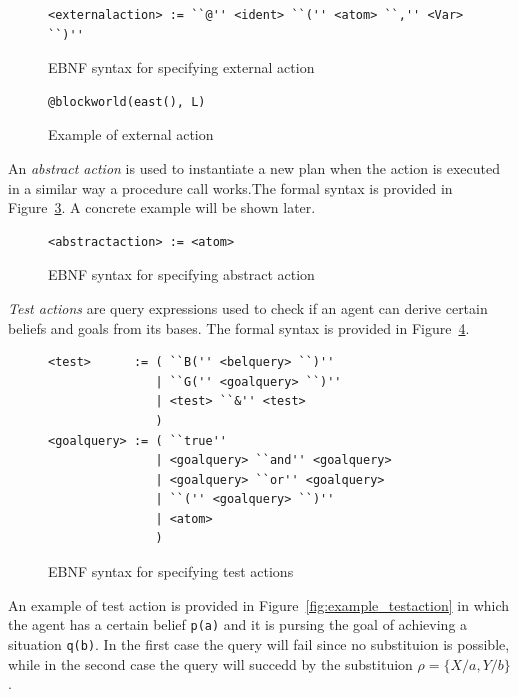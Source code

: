 \documentclass[a4paper]{article}
\begin{document}
\begin{figure}[htp]
\begin{verbatim}
<externalaction> := ``@'' <ident> ``('' <atom> ``,'' <Var> ``)''
\end{verbatim}
\caption{EBNF syntax for specifying external action}
\label{fig:ebnf_extaction}
\end{figure}

\begin{figure}[htp]
\begin{verbatim}
@blockworld(east(), L)
\end{verbatim}
\caption{Example of external action}
\label{fig:example_extaction}
\end{figure}

An \emph{abstract action} is used to instantiate a new plan when the action is executed in a similar way a procedure call works.The formal syntax is provided in Figure~\ref{fig:ebnf_absaction}. A concrete example will be shown later.

\begin{figure}[htp]
\begin{verbatim}
<abstractaction> := <atom>
\end{verbatim}
\caption{EBNF syntax for specifying abstract action}
\label{fig:ebnf_absaction}
\end{figure}

\emph{Test actions} are query expressions used to check if an agent can derive certain beliefs and goals from its bases. The formal syntax is provided in Figure~\ref{fig:ebnf_testaction}.

\begin{figure}[htp]
\begin{verbatim}
<test>      := ( ``B('' <belquery> ``)'' 
               | ``G('' <goalquery> ``)''
               | <test> ``&'' <test>
               )
<goalquery> := ( ``true'' 
               | <goalquery> ``and'' <goalquery>
               | <goalquery> ``or'' <goalquery>
               | ``('' <goalquery> ``)''
               | <atom>
               )
\end{verbatim}
\caption{EBNF syntax for specifying test actions}
\label{fig:ebnf_testaction}
\end{figure}

An example of test action is provided in Figure~\ref{fig:example_testaction} in which the agent has a certain belief \texttt{p(a)} and it is  pursing the goal of achieving a situation \texttt{q(b)}. In the first case the query will fail since no substituion is possible, while in the second case the query will succedd by the substituion $\rho=\{X/a, Y/b\}$.
\end{document}
